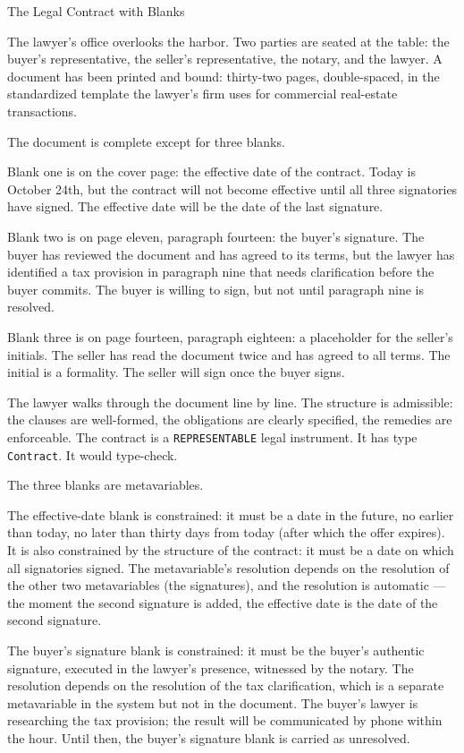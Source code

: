 \begin{coda}{The Legal Contract with Blanks}

The lawyer's office overlooks the harbor. Two parties are seated at the
table: the buyer's representative, the seller's representative, the
notary, and the lawyer. A document has been printed and bound: thirty-two
pages, double-spaced, in the standardized template the lawyer's firm
uses for commercial real-estate transactions.

The document is complete except for three blanks.

Blank one is on the cover page: the effective date of the contract.
Today is October 24th, but the contract will not become effective until
all three signatories have signed. The effective date will be the date
of the last signature.

Blank two is on page eleven, paragraph fourteen: the buyer's signature.
The buyer has reviewed the document and has agreed to its terms, but
the lawyer has identified a tax provision in paragraph nine that needs
clarification before the buyer commits. The buyer is willing to sign,
but not until paragraph nine is resolved.

Blank three is on page fourteen, paragraph eighteen: a placeholder for
the seller's initials. The seller has read the document twice and has
agreed to all terms. The initial is a formality. The seller will sign
once the buyer signs.

The lawyer walks through the document line by line. The structure is
admissible: the clauses are well-formed, the obligations are clearly
specified, the remedies are enforceable. The contract is a
\texttt{REPRESENTABLE} legal instrument. It has type \texttt{Contract}.
It would type-check.

The three blanks are metavariables.

The effective-date blank is constrained: it must be a date in the
future, no earlier than today, no later than thirty days from today
(after which the offer expires). It is also constrained by the structure
of the contract: it must be a date on which all signatories signed. The
metavariable's resolution depends on the resolution of the other two
metavariables (the signatures), and the resolution is automatic ---
the moment the second signature is added, the effective date is the
date of the second signature.

The buyer's signature blank is constrained: it must be the buyer's
authentic signature, executed in the lawyer's presence, witnessed by the
notary. The resolution depends on the resolution of the tax
clarification, which is a separate metavariable in the system but not
in the document. The buyer's lawyer is researching the tax provision;
the result will be communicated by phone within the hour. Until then,
the buyer's signature blank is carried as unresolved.


\end{coda}
